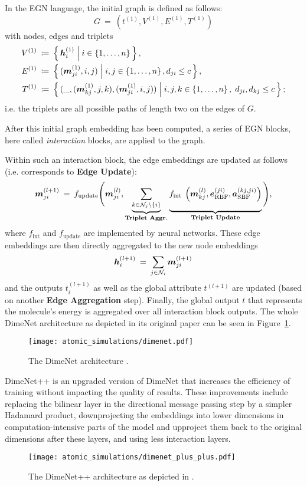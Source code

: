 In the EGN language, the initial graph is defined as follows:
\[
    G \: = \: (t^{(1)}, V^{(1)}, E^{(1)}, T^{(1)})
\]
with nodes, edges and triplets
\begin{align*}
    V^{(1)} \: &\coloneqq \: \left\{\, \boldsymbol{h}_i^{(1)} \; \middle| \; i \in \left\{1, \dots, n\right\} \,\right\}, \\
    E^{(1)} \: &\coloneqq \: \left\{\, (\boldsymbol{m}_{ji}^{(1)}, i, j) \; \middle| \; i, j \in \left\{1, \dots, n\right\}, d_{ji} \leq c \,\right\}, \\
    T^{(1)} \: &\coloneqq \: \left\{\, (\_,(\boldsymbol{m}_{kj}^{(1)}, j, k), (\boldsymbol{m}_{ji}^{(1)}, i, j)) \; \middle| \; i, j, k \in \left\{1, \dots, n\right\}, \; d_{ji}, d_{kj} \leq c \,\right\} \text{;}
\end{align*}
i.e. the triplets are all possible paths of length two on the edges of $G$.

After this initial graph embedding has been computed, a series of EGN blocks,
here called \textit{interaction} blocks, are applied to the graph.

Within such an interaction block, the edge embeddings 
are updated as follows (i.e. corresponds to \textbf{Edge Update}):
\[
    \mm_{ji}^{(l+1)} \: = \: 
    f_{\text{update}}\Bigg(\mm_{ji}^{(l)}, 
    \underbrace{\sum_{k \in \mathcal{N}_{j} \backslash\{i\}}}_{\textbf{Triplet Aggr.}} 
    \underbrace{ \vphantom{\sum_{\mathcal{N}_j}} 
    f_{\text {int }}\left(\mm_{k j}^{(l)}, \ee_{\text{RBF}}^{(ji)}, 
    \aaa_{\text{SBF}}^{(kj, ji)}\right)}
    _{\textbf{Triplet Update}}\Bigg) \text{,}
\]
where $f_{\text{int}}$ and $f_{\text{update}}$ are implemented by neural networks.
These edge embeddings are then directly aggregated to the new node embeddings
\[
    \boldsymbol{h}_i^{(l+1)} \: = \: \sum_{j \in \mathcal{N}_i} \boldsymbol{m}_{ji}^{(l+1)}
\]
and the outputs $t^{(l+1)}_i$ as well as the global attribute $t^{(l+1)}$ are
updated (based on another \textbf{Edge Aggregation} step).
Finally, the global output $t$ that represents the molecule's energy is 
aggregated over all interaction block outputs.
The whole DimeNet architecture as depicted in its original paper 
\cite{DBLP:journals/corr/abs-2003-03123} can be seen in Figure~\ref{fig:dimenet}.

\begin{figure}[H]
    \centering
    \texttt{[image: atomic\_simulations/dimenet.pdf]}
    \caption{The DimeNet architecture \cite*{DBLP:journals/corr/abs-2003-03123}.}
    \label{fig:dimenet}
\end{figure}

DimeNet++ \cite{https://doi.org/10.48550/arxiv.2011.14115} is an upgraded version of 
DimeNet that increases the efficiency of training without impacting the quality of results. 
These improvements include replacing the bilinear layer in the directional message passing 
step by a simpler Hadamard product, downprojecting the embeddings into lower dimensions in
computation-intensive parts of the model and upproject them back to the original dimensions 
after these layers, and using less interaction layers.

\begin{figure}[H]
  \centering
\texttt{[image: atomic\_simulations/dimenet\_plus\_plus.pdf]}
\caption{The DimeNet++ architecture as depicted in
\cite{https://doi.org/10.48550/arxiv.2203.09697}.}
\label{fig:dimenet_plus_plus}
\end{figure}